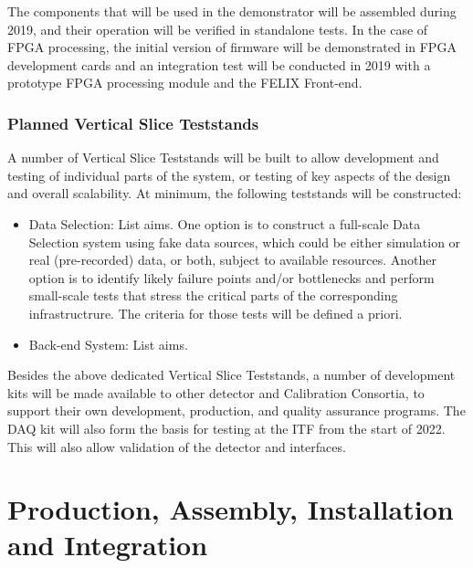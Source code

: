 The components that will be used in the 
demonstrator will be assembled during 2019, and their operation will
be verified in standalone tests. In the case of FPGA processing, the
initial version of firmware will be demonstrated in FPGA development
cards and an integration test will be conducted in 2019 with a
prototype FPGA processing module and the FELIX Front-end.


\subsubsection{Planned Vertical Slice Teststands}
\label{sec:sp-daq:validation-demonstrators}

A number of Vertical Slice Teststands will be built to allow
development and testing of individual parts of the  system,
or testing of key aspects of the design and overall scalability. At minimum, the following teststands
will be constructed:
\begin{itemize}
\item Data Selection: List aims. One option is to construct a
  full-scale Data Selection system using fake data 
sources, which could be either simulation or real (pre-recorded)
 data,
or both, subject to available resources. Another option is to identify
likely failure points and/or bottlenecks and perform
small-scale tests that stress the critical parts of the corresponding
infrastructrure. The criteria for those tests will be defined a priori.
\item Back-end System: List aims.
\end{itemize}

Besides the above dedicated Vertical Slice Teststands, a number of
 development kits will be made available to other detector and
Calibration Consortia, to support 
their own development, production, and quality assurance programs. The DAQ
kit will also form the basis for testing at the ITF from the start of 2022. This will
also allow validation of the detector and  interfaces. %

\section{Production, Assembly, Installation and Integration}
\label{sec:sp-daq:production}

